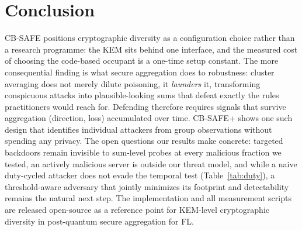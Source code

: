 \documentclass[lettersize,journal]{IEEEtran}
\begin{document}
\section{Conclusion}
CB-SAFE positions cryptographic diversity as a configuration choice rather than a
research programme: the KEM sits behind one interface, and the measured cost of
choosing the code-based occupant is a one-time setup constant. The more consequential
finding is what secure aggregation does to robustness: cluster averaging does not
merely dilute poisoning, it \emph{launders} it, transforming conspicuous attacks
into plausible-looking sums that defeat exactly the rules practitioners would reach
for. Defending therefore requires signals that survive aggregation (direction,
loss) accumulated over time. CB-SAFE+ shows one such design that identifies
individual attackers from group observations without spending any privacy. The open
questions our results make concrete: targeted backdoors remain invisible to
sum-level probes at every malicious fraction we tested, an actively malicious server
is outside our threat model, and while a naive duty-cycled attacker does not evade
the temporal test (Table~\ref{tab:duty}), a threshold-aware adversary that jointly
minimizes its footprint and detectability remains the natural next step. The implementation and all measurement scripts are
released open-source as a reference point for KEM-level cryptographic diversity
in post-quantum secure aggregation for FL.
\end{document}
